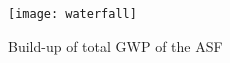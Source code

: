
\begin{figure}[H]
\texttt{[image: waterfall]}
\caption{Build-up of total GWP of the ASF}
\label{waterfall}
\end{figure}